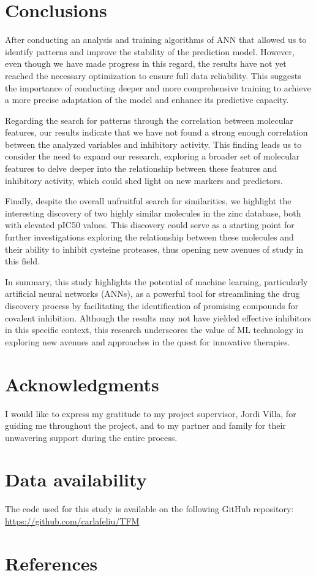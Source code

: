 \documentclass[final,times,twocolumn,article]{elsarticle}
\begin{document}
\FloatBarrier
\section{Conclusions}

After conducting an analysis and training algorithms of ANN that allowed us to identify patterns and improve the stability of the prediction model. However, even though we have made progress in this regard, the results have not yet reached the necessary optimization to ensure full data reliability. This suggests the importance of conducting deeper and more comprehensive training to achieve a more precise adaptation of the model and enhance its predictive capacity.

Regarding the search for patterns through the correlation between molecular features, our results indicate that we have not found a strong enough correlation between the analyzed variables and inhibitory activity. This finding leads us to consider the need to expand our research, exploring a broader set of molecular features to delve deeper into the relationship between these features and inhibitory activity, which could shed light on new markers and predictors.

Finally, despite the overall unfruitful search for similarities, we highlight the interesting discovery of two highly similar molecules in the zinc database, both with elevated pIC50 values. This discovery could serve as a starting point for further investigations exploring the relationship between these molecules and their ability to inhibit cysteine proteases, thus opening new avenues of study in this field.

In summary, this study highlights the potential of machine learning, particularly artificial neural networks (ANNs), as a powerful tool for streamlining the drug discovery process by facilitating the identification of promising compounds for covalent inhibition. Although the results may not have yielded effective inhibitors in this specific context, this research underscores the value of ML technology in exploring new avenues and approaches in the quest for innovative therapies.

\appendix

\section{Acknowledgments}

I would like to express my gratitude to my project supervisor, Jordi Villa, for guiding me throughout the project, and to my partner and family for their unwavering support during the entire process.

\section{Data availability}

The code used for this study is available on the following GitHub repository: \href{https://github.com/carlafeliu/TFM}{https://github.com/carlafeliu/TFM}


\section{References}
 

\end{document}
